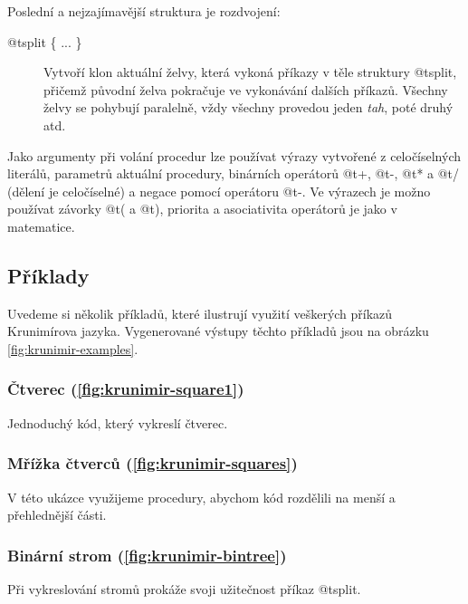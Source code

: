 Poslední a nejzajímavější struktura je rozdvojení:

\begin{description}
\item[@t{split \{ ... \}}] Vytvoří klon aktuální želvy, která vykoná příkazy v
  těle struktury @t{split}, přičemž původní želva pokračuje ve vykonávání
  dalších příkazů. Všechny želvy se pohybují paralelně, vždy všechny provedou
  jeden \emph{tah}, poté druhý atd.
\end{description}

Jako argumenty při volání procedur lze používat výrazy vytvořené z celočíselných
literálů, parametrů aktuální procedury, binárních operátorů @t{+}, @t{-}, @t{*}
a @t{/} (dělení je celočíselné) a negace pomocí operátoru @t{-}. Ve výrazech je
možno používat závorky @t{(} a @t{)}, priorita a asociativita operátorů je jako
v matematice.

\subsection{Příklady}

Uvedeme si několik příkladů, které ilustrují využití veškerých příkazů
Krunimírova jazyka. Vygenerované výstupy těchto příkladů jsou na obrázku
\ref{fig:krunimir-examples}.

\subsubsection{Čtverec (\ref{fig:krunimir-square1})}

Jednoduchý kód, který vykreslí čtverec. 


\subsubsection{Mřížka čtverců (\ref{fig:krunimir-squares})}

V této ukázce využijeme procedury, abychom kód rozdělili na menší a přehlednější
části.


\subsubsection{Binární strom (\ref{fig:krunimir-bintree})}

Při vykreslování stromů prokáže svoji užitečnost příkaz @t{split}.


